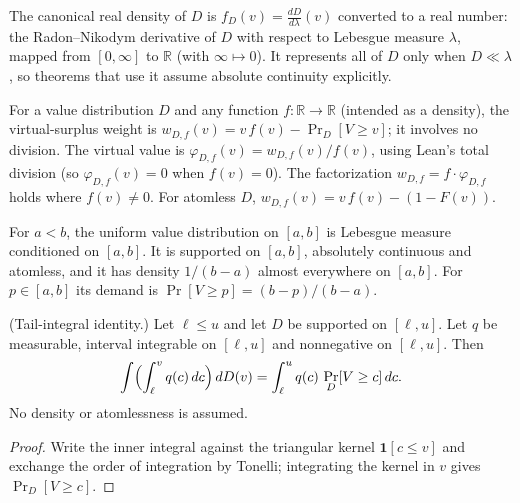 \begin{definition}\label{def:MathEconLib.ValueDistribution.realDensity}\leanok
{}
The canonical real density of $D$ is $f_D(v)=\tfrac{dD}{d\lambda}(v)$ converted to a real number: the Radon--Nikodym derivative of $D$ with respect to Lebesgue measure $\lambda$, mapped from $[0,\infty]$ to $\mathbb{R}$ (with $\infty\mapsto 0$). It represents all of $D$ only when $D\ll\lambda$, so theorems that use it assume absolute continuity explicitly.
\end{definition}

\begin{definition}\label{def:MathEconLib.ValueDistribution.virtualSurplusWeight}\leanok
{}
For a value distribution $D$ and any function $f:\mathbb{R}\to\mathbb{R}$ (intended as a density), the virtual-surplus weight is $w_{D,f}(v)=v\,f(v)-\Pr_D[V\ge v]$; it involves no division. The virtual value is $\varphi_{D,f}(v)=w_{D,f}(v)/f(v)$, using Lean's total division (so $\varphi_{D,f}(v)=0$ when $f(v)=0$). The factorization $w_{D,f}=f\cdot\varphi_{D,f}$ holds where $f(v)\neq0$. For atomless $D$, $w_{D,f}(v)=v\,f(v)-(1-F(v))$.
\end{definition}

\begin{definition}\label{def:MathEconLib.ValueDistribution.uniformInterval}\leanok
{}
For $a<b$, the uniform value distribution on $[a,b]$ is Lebesgue measure conditioned on $[a,b]$. It is supported on $[a,b]$, absolutely continuous and atomless, and it has density $1/(b-a)$ almost everywhere on $[a,b]$. For $p\in[a,b]$ its demand is $\Pr[V\ge p]=(b-p)/(b-a)$.
\end{definition}

\begin{theorem}\label{thm:MathEconLib.ValueDistribution.integral_intervalIntegral_eq_integral_mul_probAtLeast}\leanok
{}
(Tail-integral identity.) Let $\ell\le u$ and let $D$ be supported on $[\ell,u]$. Let $q$ be measurable, interval integrable on $[\ell,u]$ and nonnegative on $[\ell,u]$. Then
\[
\int\Bigl(\int_{\ell}^{v}q(c)\,dc\Bigr)\,dD(v)=\int_{\ell}^{u}q(c)\,\Pr_D[V\ge c]\,dc .
\]
No density or atomlessness is assumed.
\end{theorem}
\begin{proof}\leanok
Write the inner integral against the triangular kernel $\mathbf 1[c\le v]$ and exchange the order of integration by Tonelli; integrating the kernel in $v$ gives $\Pr_D[V\ge c]$.
\end{proof}

